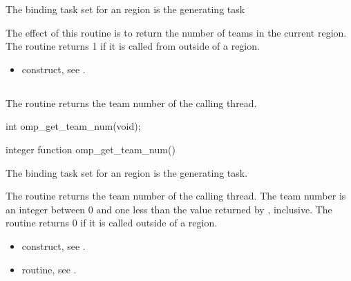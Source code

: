 \binding
The binding task set for an  region is the generating task

\effect
The effect of this routine is to return the number of teams in the current  region. 
The routine returns 1 if it is called from outside of a  region.

\crossreferences
\begin{itemize}
\item {} construct, see 
. 
\end{itemize}










\pagebreak
\subsection{}
\label{subsec:omp_get_team_num}
\summary
The  routine returns the team number of the calling thread.

\format
\begin{ccppspecific}
\begin{boxedcode}
int omp\_get\_team\_num(void);
\end{boxedcode}
\end{ccppspecific}

\begin{fortranspecific}
\begin{boxedcode}
integer function omp\_get\_team\_num()
\end{boxedcode}
\end{fortranspecific}

\binding
The binding task set for an  region is the generating task.

\effect
The  routine returns the team number of the calling thread. The 
team number is an integer between 0 and one less than the value returned by 
, inclusive. The routine returns 0 if it is called outside of a 
 region.

\crossreferences
\begin{itemize}
\item {} construct, see 
.

\item {} routine, see 
. 
\end{itemize}









